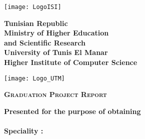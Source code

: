 


\thispagestyle{cover}%
\hspace{-47pt}
\begin{minipage}[l]{0.2\columnwidth}
    \vspace{6mm}
    \texttt{[image: LogoISI]}\\
\end{minipage}
\hfill
\begin{minipage}[l]{0.6\columnwidth}
    \centering
    \footnotesize
    \textbf{{Tunisian Republic}}\\
    \vspace{1.5mm}
    \textbf{{Ministry of Higher Education\\ and Scientific Research}}\\
    \vspace{1.5mm}
    \textbf{{University of Tunis El Manar}}\\
    \vspace{1.5mm}
    \textbf{{Higher Institute of Computer Science}}
\end{minipage}
\hfill
\begin{minipage}[l]{0.02\columnwidth}
\end{minipage}
\hfill
\begin{minipage}[l]{0.18\columnwidth}
    \vspace{6mm}
    \texttt{[image: Logo\_UTM]}\\
\end{minipage}
\vskip1.5cm

\begin{center}
    {\LARGE{\textbf{\textsc{Graduation Project Report}}}}\\
    \vskip0.5cm
    \large

    {\textbf{Presented for the purpose of obtaining}}\\
    \vskip2mm
    {\textbf{\@diplomaName}}\\
    {\textbf{Speciality : \@speciality}}\\
    {}
\end{center}

